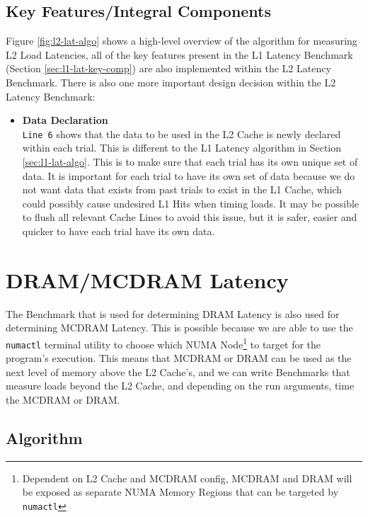 \documentclass[bsc,frontabs,twoside,singlespacing,parskip,deptreport]{infthesis}     %
\begin{document}
\subsection{Key Features/Integral Components}\label{sec:l2-lat-key-comp}
Figure \ref{fig:l2-lat-algo} shows a high-level overview of the algorithm for measuring L2 Load Latencies, all of the key features present in the L1 Latency Benchmark (Section \ref{sec:l1-lat-key-comp}) are also implemented within the L2 Latency Benchmark. There is also one more important design decision within the L2 Latency Benchmark:
\begin{itemize}
    \item{{\bf Data Declaration} \\
    \texttt{Line 6} shows that the data to be used in the L2 Cache is newly declared within each trial. This is different to the L1 Latency algorithm in Section \ref{sec:l1-lat-algo}. This is to make sure that each trial has its own unique set of data. It is important for each trial to have its own set of data because we do not want data that exists from past trials to exist in the L1 Cache, which could possibly cause undesired L1 Hits when timing loads. It may be possible to flush all relevant Cache Lines to avoid this issue, but it is safer, easier and quicker to have each trial have its own data.
    }\label{data-declaration-consideration-L2}
\end{itemize}


\newpage

\section{DRAM/MCDRAM Latency}\label{mcdram-dram-benchmarks-lat}
The Benchmark that is used for determining DRAM Latency is also used for determining MCDRAM Latency. This is possible because we are able to use the \texttt{numactl}\cite{numactl_man} terminal utility to choose which NUMA Node\footnote{Dependent on L2 Cache and MCDRAM config, MCDRAM and DRAM will be exposed as separate NUMA Memory Regions that can be targeted by \texttt{numactl}} to target for the program's execution. This means that MCDRAM or DRAM can be used as the next level of memory above the L2 Cache's, and we can write Benchmarks that measure loads beyond the L2 Cache, and depending on the run arguments, time the MCDRAM or DRAM.
\subsection{Algorithm}
\end{document}
